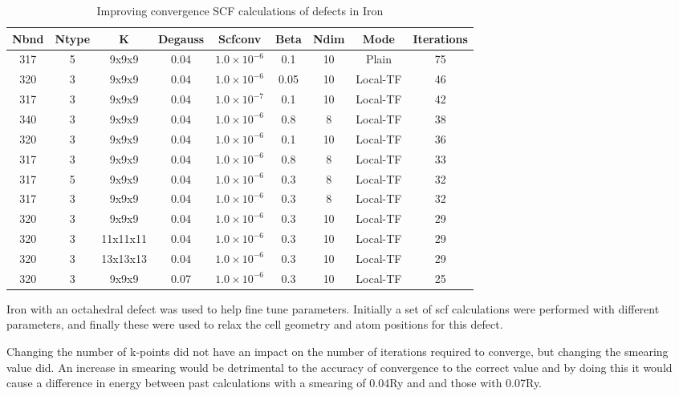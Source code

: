 \begin{table}[h]
\begin{center}
\begin{tabular}{c c c c c c c c c}
\hline\hline
Nbnd & Ntype & K & Degauss & Scfconv & Beta & Ndim & Mode & Iterations \\
\hline\hline
317 & 5 & 9x9x9 & 0.04 & $1.0 \times 10^{-6}$ & 0.1 & 10 & Plain & 75 \\
320 & 3 & 9x9x9 & 0.04 & $1.0 \times 10^{-6}$ & 0.05 & 10 & Local-TF & 46 \\
317 & 3 & 9x9x9 & 0.04 & $1.0 \times 10^{-7}$ & 0.1 & 10 & Local-TF & 42 \\
340 & 3 & 9x9x9 & 0.04 & $1.0 \times 10^{-6}$ & 0.8 & 8 & Local-TF & 38 \\
320 & 3 & 9x9x9 & 0.04 & $1.0 \times 10^{-6}$ & 0.1 & 10 & Local-TF & 36 \\
317 & 3 & 9x9x9 & 0.04 & $1.0 \times 10^{-6}$ & 0.8 & 8 & Local-TF & 33 \\
317 & 5 & 9x9x9 & 0.04 & $1.0 \times 10^{-6}$ & 0.3 & 8 & Local-TF & 32 \\
317 & 3 & 9x9x9 & 0.04 & $1.0 \times 10^{-6}$ & 0.3 & 8 & Local-TF & 32 \\
320 & 3 & 9x9x9 & 0.04 & $1.0 \times 10^{-6}$ & 0.3 & 10 & Local-TF & 29 \\
320 & 3 & 11x11x11 & 0.04 & $1.0 \times 10^{-6}$ & 0.3 & 10 & Local-TF & 29 \\
320 & 3 & 13x13x13 & 0.04 & $1.0 \times 10^{-6}$ & 0.3 & 10 & Local-TF & 29 \\
320 & 3 & 9x9x9 & 0.07 & $1.0 \times 10^{-6}$ & 0.3 & 10 & Local-TF & 25 \\
\hline\hline
\end{tabular}
\end{center}
\caption{Improving convergence SCF calculations of defects in Iron}
\label{table:trialparametersocta}
\end{table}

Iron with an octahedral defect was used to help fine tune parameters.  Initially a set of \acrshort{scf} calculations were performed with different parameters, and finally these were used to relax the cell geometry and atom positions for this defect.

Changing the number of k-points did not have an impact on the number of iterations required to converge, but changing the smearing value did.  An increase in smearing would be detrimental to the accuracy of convergence to the correct value and by doing this it would cause a difference in energy between past calculations with a smearing of 0.04Ry and and those with 0.07Ry.

